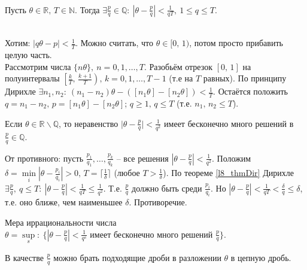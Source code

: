 \begin{theorem} \label{l8_thmDir}~\\
	Пусть $\theta \in \mathbb{R}, \, T \in \mathbb{N}$. Тогда
	$\displaystyle \exists \frac{p}{q} \in \mathbb{Q}: \ \left| \theta - \frac{p}{q} \right| < \frac{1}{qT}, \ 1 \leq q \leq T$.
\end{theorem}
\begin{pf}~\\
	Хотим: $\displaystyle |q\theta - p| < \frac{1}{T}$. Можно считать, что $\theta \in [0, \, 1)$, потом просто прибавить целую часть.\\
	Рассмотрим числа $\{ n\theta \}, \ n = 0,1,\dots,T$. Разобьём отрезок $[0, \, 1]$ на полуинтервалы
	$\displaystyle \left[ \frac{k}{T}, \, \frac{k+1}{T} \right), \, k=0,1,\dots,T-1$ (т.е на $T$ равных). По принципу Дирихле
	$\displaystyle \exists n_1,n_2: \ \left( n_1 - n_2 \right)\theta - \left( \left[n_1\theta\right]-\left[n_2\theta\right] \right) < \frac{1}{T}$.
	Остаётся положить $q = n_1-n_2, \, p = \left[ n_1\theta \right] - \left[ n_2\theta \right]$; $q \geq 1, \, q \leq T$ (т.е. $n_1,\,n_2 \leq T$).
\end{pf}

\begin{corollary}
	Если $\theta \in \mathbb{R} \backslash \mathbb{Q}$, то неравенство
	$\displaystyle \lvert \theta - \frac{p}{q} \rvert < \frac{1}{q^2}$ имеет бесконечно много решений в $\frac{p}{q} \in \mathbb{Q}$.
\end{corollary}
\begin{pf}
	От противного: пусть $\displaystyle \frac{p_1}{q_1},\dots,\frac{p_k}{q_k}$ -- все решения $\displaystyle \left| \theta - \frac{p}{q} \right| < \frac{1}{q^2}$. Положим $\displaystyle \delta = \min\limits_i \left| \theta - \frac{p_i}{q_i} \right| > 0, \, T = \lceil \frac{1}{\delta} \rceil$ (любое $\displaystyle T > \frac{1}{\delta}$). По теореме \ref{l8_thmDir} Дирихле $\displaystyle \exists \frac{p}{q}, \ q \leq T: \ \left| \theta - \frac{p}{q} \right| < \frac{1}{qT} \leq \frac{1}{q^2}$. Т.е. $\displaystyle \frac{p}{q}$ должно быть среди $\displaystyle \frac{p_i}{q_i}$. Но $\displaystyle \left| \theta - \frac{p}{q} \right| < \frac{1}{qT} < \frac{\delta}{q} \leq \delta$, т.е. оно ближе, чем наименьшее $\delta$. Противоречие.
\end{pf}

Мера иррациональности числа $\displaystyle \theta = \sup\limits_s : \ \{ \left| \theta - \frac{p}{q} \right| < \frac{1}{q^s} \text{ имеет бесконечно много решений } \frac{p}{q} \}$.

В качестве $\displaystyle \frac{p}{q}$ можно брать подходящие дроби в разложении $\theta$ в цепную дробь.